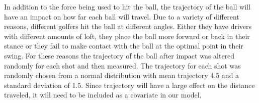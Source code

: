 \documentclass{article}\usepackage[]{graphicx}\usepackage[]{color}
\begin{document}
In addition to the force being used to hit the ball, the trajectory of the ball will have an impact on how far each ball will travel. Due to a variety of different reasons, different golfers hit the ball at different angles. Either they have drivers with different amounts of loft, they place the ball more forward or back in their stance or they fail to make contact with the ball at the optimal point in their swing. For these reasons the trajectory of the ball after impact was altered randomly for each shot and then measured. The trajectory for each shot was randomly chosen from a normal distribution with mean trajectory 4.5 and a standard deviation of 1.5. Since trajectory will have a large effect on the distance traveled, it will need to be included as a covariate in our model. 
\end{document}
